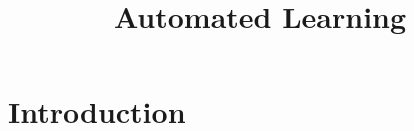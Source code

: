 \documentclass[12pt]{report}
\title {Automated Learning}
\begin{document}
\maketitle
\tableofcontents

\chapter{Introduction}
\end{document}
